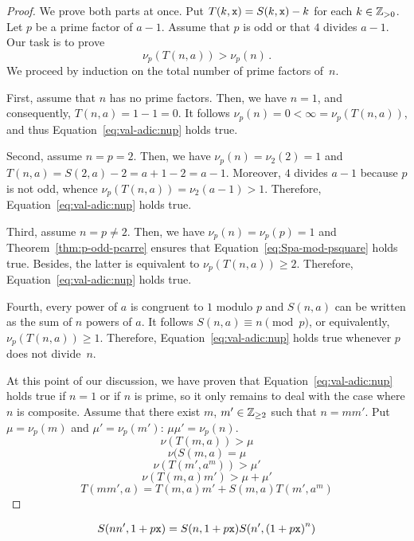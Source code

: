  \begin{proof}
   We prove both parts at once.
   Put $T(k, \mathtt{x})  = S(k, \mathtt{x}) - k$ for each $k \in \mathbb{Z}_{> 0}$.
   Let $p$ be a prime factor of $a - 1$.
   Assume that $p$ is odd or that $4$ divides $a - 1$.
   Our task is to prove
   \begin{equation}  \label{eq:val-adic:nup}
   \nu_p(T(n, a)) > \nu_p(n) \, . 
   \end{equation}
   We proceed by induction on the total number of prime factors of~$n$.

   First, assume that $n$ has no prime factors.
   Then, we have $n = 1$, and consequently, $T(n, a)  = 1 - 1 = 0$.
   It follows $\nu_p(n) = 0 < \infty = \nu_p(T(n, a))$,
   and thus Equation~\eqref{eq:val-adic:nup} holds true.

   Second, assume $n = p = 2$.
   Then, we have
   $\nu_p(n) = \nu_2(2) = 1$
   and 
   $T(n, a) = S(2, a) - 2 = a + 1 - 2 = a - 1$.
   Moreover, $4$ divides $a - 1$ because $p$ is not odd,
   whence $\nu_p(T(n, a)) = \nu_2(a - 1) > 1$.
   Therefore, Equation~\eqref{eq:val-adic:nup} holds true.

   Third, assume $n = p \ne 2$.
   Then,
   we have $\nu_p(n) = \nu_p(p) = 1$
   and
   Theorem~\ref{thm:p-odd-pcarre} ensures that Equation~\eqref{eq:Spa-mod-psquare} holds true.
   Besides, the latter is equivalent to $\nu_p(T(n, a)) \ge 2$.
   Therefore, Equation~\eqref{eq:val-adic:nup} holds true.

   Fourth, every power of $a$ is congruent to $1$ modulo $p$
   and
   $S(n, a)$ can be written as the sum of $n$ powers of $a$.
   It follows $S(n, a) \equiv n \pmod {p}$, or equivalently, $\nu_p(T(n, a)) \ge 1$.
   Therefore, Equation~\eqref{eq:val-adic:nup} holds true whenever $p$ does not divide~$n$.
 
   At this point of our discussion,
   we have proven that Equation~\eqref{eq:val-adic:nup} holds true if $n = 1$ or if $n$ is prime,
   so it only remains to deal with the case where $n$ is composite.
   Assume that there exist $m$, $m' \in \mathbb{Z}_{\ge 2}$ such that $n = mm'$.
   Put $\mu = \nu_p(m)$ and $\mu' = \nu_p(m')$: $\mu\mu' = \nu_p(n)$.
   $$
   \nu(T(m, a)) > \mu
   $$
   $$
   \nu(S(m, a) = \mu
   $$
   $$
   \nu(T(m', a^m)) > \mu'
   $$
   $$
   \nu(T(m, a) m') > \mu + \mu' 
   $$
   $$
   T(mm', a) = T(m, a) m' +  S(m, a) T(m', a^m) 
   $$
 \end{proof}

   $$
   S(nn', 1 + p \mathtt{x}) 
   =
   S(n, 1 + p \mathtt{x})  S(n', {(1 + p \mathtt{x})}^n)
   $$
